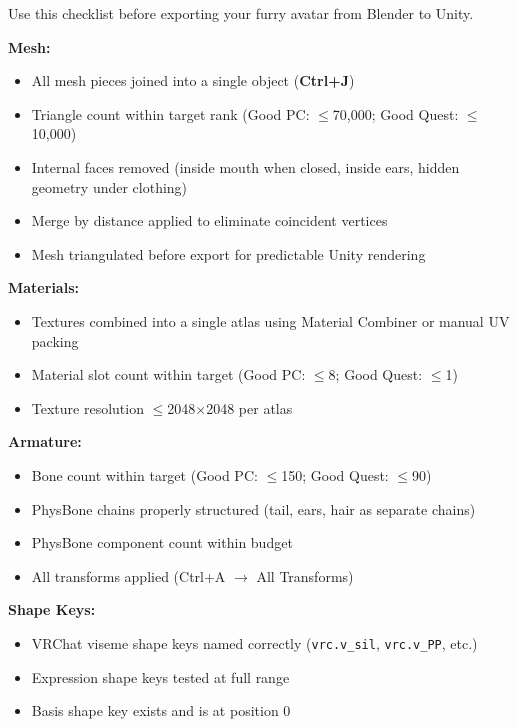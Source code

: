 \begin{furrybox}[title={\sffamily\bfseries\small\textcolor{white}{VRChat Avatar Optimization Checklist}}]
Use this checklist before exporting your furry avatar from Blender to Unity.

\textbf{Mesh:}
\begin{itemize}[leftmargin=1.5em]
  \item[$\square$] All mesh pieces joined into a single object (\textbf{Ctrl+J})
  \item[$\square$] Triangle count within target rank (Good PC: $\leq$70,000; Good Quest: $\leq$10,000)
  \item[$\square$] Internal faces removed (inside mouth when closed, inside ears, hidden geometry under clothing)
  \item[$\square$] Merge by distance applied to eliminate coincident vertices
  \item[$\square$] Mesh triangulated before export for predictable Unity rendering
\end{itemize}

\textbf{Materials:}
\begin{itemize}[leftmargin=1.5em]
  \item[$\square$] Textures combined into a single atlas using Material Combiner or manual UV packing
  \item[$\square$] Material slot count within target (Good PC: $\leq$8; Good Quest: $\leq$1)
  \item[$\square$] Texture resolution $\leq$2048$\times$2048 per atlas
\end{itemize}

\textbf{Armature:}
\begin{itemize}[leftmargin=1.5em]
  \item[$\square$] Bone count within target (Good PC: $\leq$150; Good Quest: $\leq$90)
  \item[$\square$] PhysBone chains properly structured (tail, ears, hair as separate chains)
  \item[$\square$] PhysBone component count within budget
  \item[$\square$] All transforms applied (Ctrl+A $\rightarrow$ All Transforms)
\end{itemize}

\textbf{Shape Keys:}
\begin{itemize}[leftmargin=1.5em]
  \item[$\square$] VRChat viseme shape keys named correctly (\texttt{vrc.v\_sil}, \texttt{vrc.v\_PP}, etc.)
  \item[$\square$] Expression shape keys tested at full range
  \item[$\square$] Basis shape key exists and is at position 0
\end{itemize}


\end{furrybox}
